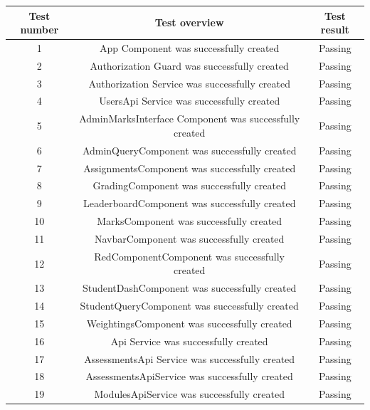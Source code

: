 \documentclass[a4paper,12pt]{article}
\begin{document}
        		
        	\begin{tabular}{ |c|c|c| } 
        		\hline
        		Test number & Test overview & Test result \\
        		\hline
        		1 & App Component was successfully created & Passing\\
        		\hline
       			2 & Authorization Guard was successfully created & Passing\\
        		\hline
        		3 & Authorization Service was successfully created & Passing\\
        		\hline
        		4 & UsersApi Service was successfully created & Passing\\
        		\hline
				5 & AdminMarksInterface Component was successfully created & Passing\\
        		\hline
       			6 & AdminQueryComponent was successfully created & Passing\\
        		\hline
        		7 & AssignmentsComponent was successfully created & Passing\\
        		\hline
        		8 & GradingComponent was successfully created & Passing\\
        		\hline
        		9 & LeaderboardComponent was successfully created & Passing\\
        		\hline
        		10 & MarksComponent was successfully created & Passing\\
        		\hline
        		11 & NavbarComponent was successfully created & Passing\\
        		\hline
        		12 & RedComponentComponent was successfully created & Passing\\
        		\hline
        		13 & StudentDashComponent was successfully created & Passing\\
        		\hline
        		14 & StudentQueryComponent was successfully created & Passing\\
        		\hline
        		15 & WeightingsComponent was successfully created & Passing\\
        		\hline
        		16 & Api Service was successfully created & Passing\\
        		\hline
     			17 & AssessmentsApi Service was successfully created & Passing\\
        		\hline
        		18 & AssessmentsApiService was successfully created & Passing\\
        		\hline
        		19 & ModulesApiService was successfully created & Passing\\
        		\hline
        	\end{tabular}
        
\end{document}
